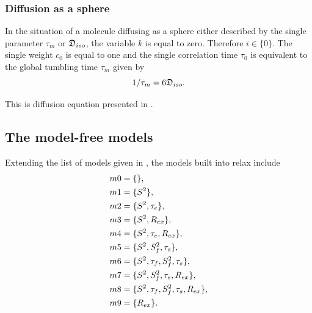 \begin{htmlonly}
\begin{htmlonly}
\subsubsection{Diffusion as a sphere}

In the situation of a molecule diffusing as a sphere either described by the single parameter $\tau_m$ or $\mathfrak{D}_{iso}$, the variable $k$ is equal to zero.
Therefore $i \in \{0\}$.
The single weight $c_0$ is equal to one and the single correlation time $\tau_0$ is equivalent to the global tumbling time $\tau_m$ given by
\begin{equation} \label{eq: sphere tau0}
    1/\tau_m = 6\mathfrak{D}_{iso}.
\end{equation}

\noindent This is diffusion equation presented in \citet{Bloembergen48}.



\subsection{The model-free models}

Extending the list of models given in \citet{Mandel95, Fushman97, Orekhov99b, Korzhnev01, Zhuravleva04}, the models built into relax include
\begin{subequations}
\renewcommand{\theequation}{\theparentequation .\arabic{equation}}
\addtocounter{equation}{-1}
\begin{align}
 m0 &= \{\},                                   \label{model: m0} \\
 m1 &= \{S^2\},                                \label{model: m1} \\
 m2 &= \{S^2, \tau_e\},                        \label{model: m2} \\
 m3 &= \{S^2, R_{ex}\},                        \label{model: m3} \\
 m4 &= \{S^2, \tau_e, R_{ex}\},                \label{model: m4} \\
 m5 &= \{S^2, S^2_f, \tau_s\},                 \label{model: m5} \\
 m6 &= \{S^2, \tau_f, S^2_f, \tau_s\},         \label{model: m6} \\
 m7 &= \{S^2, S^2_f, \tau_s, R_{ex}\},         \label{model: m7} \\
 m8 &= \{S^2, \tau_f, S^2_f, \tau_s, R_{ex}\}, \label{model: m8} \\
 m9 &= \{R_{ex}\}.                             \label{model: m9}
\end{align}
\end{subequations}


\end{htmlonly}
\end{htmlonly}
